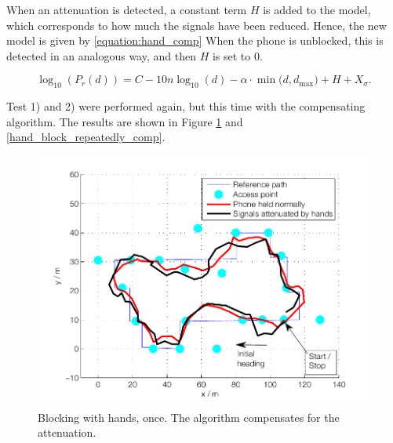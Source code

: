 \documentclass{LTHthesis}
\begin{document}
When an attenuation is detected, a constant term $H$ is added to the model, which corresponds to how much the signals have been reduced. Hence, the new model is given by \ref{equation:hand_comp}  When the phone is unblocked, this is detected in an analogous way, and then $H$ is set to 0. 

\begin{equation}
\log_{10}({P_r(d)})=C-10n\log_{10}(d) - \alpha\cdot\min({d, d_{\text{max}})}+H+ X_\sigma.
\label{equation:hand_comp}
\end{equation}

Test 1) and 2) were performed again, but this time with the compensating algorithm. The results are shown in Figure \ref{hand_block_comp} and \ref{hand_block_repeatedly_comp}.

\begin{figure}[!htb]

\includegraphics[width=1\textwidth ]{images/adapt_parameters/hand_block_comp}
\caption{Blocking with hands, once. The algorithm compensates for the attenuation.}\label{hand_block_comp}
\end{figure}
\end{document}
